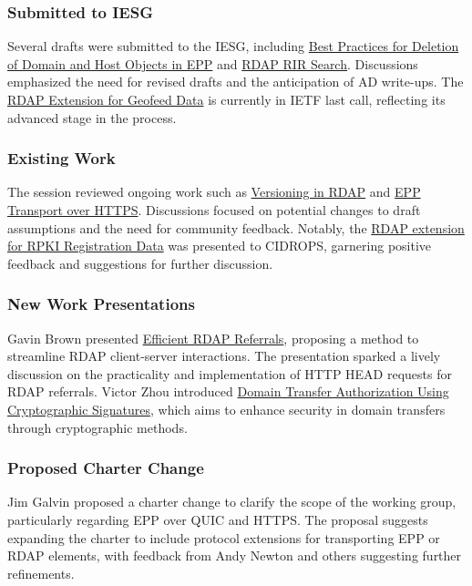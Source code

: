 \documentclass{article}
\begin{document}
\subsubsection{Submitted to IESG}
Several drafts were submitted to the IESG, including \href{https://datatracker.ietf.org/doc/draft-ietf-regext-epp-delete-bcp/}{Best Practices for Deletion of Domain and Host Objects in EPP} and \href{https://datatracker.ietf.org/doc/draft-ietf-regext-rdap-rir-search/}{RDAP RIR Search}. Discussions emphasized the need for revised drafts and the anticipation of AD write-ups. The \href{https://datatracker.ietf.org/doc/draft-ietf-regext-rdap-geofeed/}{RDAP Extension for Geofeed Data} is currently in IETF last call, reflecting its advanced stage in the process.

\subsubsection{Existing Work}
The session reviewed ongoing work such as \href{https://datatracker.ietf.org/doc/draft-ietf-regext-rdap-versioning/}{Versioning in RDAP} and \href{https://datatracker.ietf.org/doc/draft-ietf-regext-epp-https/}{EPP Transport over HTTPS}. Discussions focused on potential changes to draft assumptions and the need for community feedback. Notably, the \href{https://datatracker.ietf.org/doc/draft-ietf-regext-rdap-rpki/}{RDAP extension for RPKI Registration Data} was presented to CIDROPS, garnering positive feedback and suggestions for further discussion.

\subsubsection{New Work Presentations}
Gavin Brown presented \href{https://datatracker.ietf.org/doc/draft-brown-rdap-referrals/}{Efficient RDAP Referrals}, proposing a method to streamline RDAP client-server interactions. The presentation sparked a lively discussion on the practicality and implementation of HTTP HEAD requests for RDAP referrals. Victor Zhou introduced \href{https://github.com/xinbenlv/rfc-draft-authcodesec/blob/main/draft-zzn-authcodesec-00.txt}{Domain Transfer Authorization Using Cryptographic Signatures}, which aims to enhance security in domain transfers through cryptographic methods.

\subsubsection{Proposed Charter Change}
Jim Galvin proposed a charter change to clarify the scope of the working group, particularly regarding EPP over QUIC and HTTPS. The proposal suggests expanding the charter to include protocol extensions for transporting EPP or RDAP elements, with feedback from Andy Newton and others suggesting further refinements.
\end{document}
